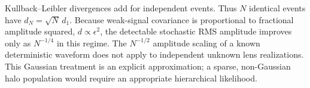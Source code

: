 Kullback--Leibler divergences add for independent events. Thus \(N\) identical
events have \(d_N=\sqrt{N}\,d_1\). Because weak-signal covariance is proportional
to fractional amplitude squared, \(d\propto\epsilon^2\), the detectable
stochastic RMS amplitude improves only as \(N^{-1/4}\) in this regime. The
\(N^{-1/2}\) amplitude scaling of a known deterministic waveform does not apply
to independent unknown lens realizations. This Gaussian treatment is an
explicit approximation; a sparse, non-Gaussian halo population would require
an appropriate hierarchical likelihood.
